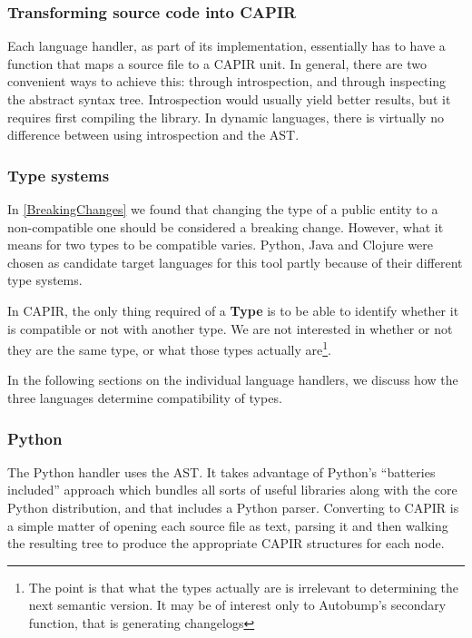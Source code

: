 \documentclass{l4proj}
\begin{document}

\subsubsection{Transforming source code into CAPIR}

Each language handler, as part of its implementation, essentially has
to have a function that maps a source file to a CAPIR unit. In
general, there are two convenient ways to achieve this: through
introspection, and through inspecting the abstract syntax tree.
Introspection would usually yield better results, but it requires
first compiling the library. In dynamic languages, there is virtually no
difference between using introspection and the AST.


\subsubsection{Type systems}
\label{TypeSystems}

In \ref{BreakingChanges} we found that changing the type of a public
entity to a non-compatible one should be considered a breaking change.
However, what it means for two types to be compatible varies. Python,
Java and Clojure were chosen as candidate target languages for this
tool partly because of their different type systems.

In CAPIR, the only thing required of a \textbf{Type} is to be able to
identify whether it is compatible or not with another type. We are not
interested in whether or not they are the same type, or what those
types actually are\footnote{The point is that what the types actually
are is irrelevant to determining the next semantic version. It may be
of interest only to Autobump's secondary function, that is generating
changelogs}.

In the following sections on the individual language handlers, we
discuss how the three languages determine compatibility of types.

\subsubsection{Python}

The Python handler uses the AST. It takes advantage of
Python's ``batteries included'' approach which bundles all sorts of
useful libraries along with the core Python distribution, and that
includes a Python parser. Converting to CAPIR is a simple matter of
opening each source file as text, parsing it and then walking the
resulting tree to produce the appropriate CAPIR structures for each node.
\end{document}
